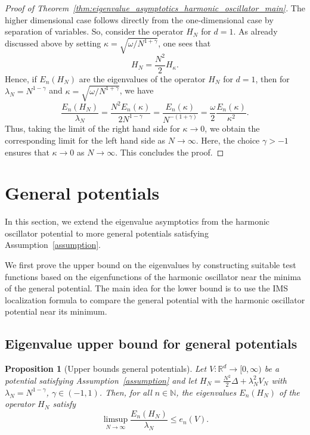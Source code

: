 \documentclass[12pt, reqno]{amsart}
\newtheorem{proposition}[theorem]{Proposition}
\theoremstyle{definition}
\numberwithin{equation}{section}
\newcommand{\R}{{\mathbb R}}
\newcommand{\N}{{\mathbb N}}
\begin{document}
\begin{proof}[Proof of Theorem~\ref{thm:eigenvalue_asymptotics_harmonic_oscillator_main}]
    The higher dimensional case follows directly from the one-dimensional case by separation of variables. So, consider the operator $H_N$ for $d=1$.
    As already discussed above by setting $\kappa=\sqrt{\omega/N^{1+\gamma}}$, one sees that
$$H_N = \frac{N^2}{2}H_\kappa.$$
Hence, if $E_n(H_N)$ are the eigenvalues  of the operator $H_N$ for $d=1$, then for $\lambda_N=N^{1-\gamma}$ and $\kappa=\sqrt{\omega/N^{1+\gamma}}$, we have
$$\frac{E_n(H_N)}{\lambda_N}= \frac{N^2 E_n(\kappa)}{2 N^{1-\gamma}}= \frac{ E_n(\kappa)}{ N^{-(1+\gamma)}} =\frac{\omega}{2}\frac{E_n(\kappa)}{\kappa^2}.$$
Thus, taking the limit of the right hand side for $\kappa\to 0$, we obtain the corresponding limit for the left hand side as $N\to\infty$. Here, the choice $\gamma>-1$ ensures that $\kappa\to 0$ as $N\to\infty$. This concludes the proof.    
\end{proof}


\section{General potentials}\label{sec:general_potentials}
In this section, we extend the eigenvalue asymptotics from the harmonic oscillator potential to more general potentials satisfying Assumption~\ref{assumption}.


We first prove the upper bound on the eigenvalues by constructing suitable test functions based on the eigenfunctions of the harmonic oscillator near the minima of the general potential.
The main idea for the lower bound is to use the IMS localization formula to compare the general potential with the harmonic oscillator potential near its minimum.


\subsection{Eigenvalue upper bound for general potentials}

\begin{proposition}[Upper bounds general potentials]\label{prop:upper_bound_general_potential}
    Let $V:\R^d\to [0,\infty)$ be a potential satisfying Assumption~\ref{assumption} and let $H_N=\frac{N^2}2\Delta + \lambda_N^2 V_N$ with $\lambda_N=N^{1-\gamma}$, $\gamma\in(-1,1)$. Then, for all  $n\in \N$,  the eigenvalues $E_{n}(H_N)$ of the operator $H_{N}$ satisfy
    $$\limsup_{N\to \infty}\frac{E_{n}(H_N)}{\lambda_N} \le   e_n(V).$$ 
\end{proposition}
\end{document}
